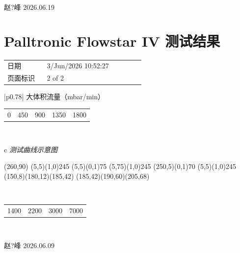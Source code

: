 \documentclass[UTF8,10pt,a4paper,fontset=fandol]{ctexart}
\newcommand{\fieldvalue}[1]{#1}
\newcommand{\handwritten}[1]{#1}
\begin{document}
\vspace{1em}

\handwritten{赵?峰 2026.06.19}

\section*{Palltronic Flowstar IV 测试结果}

\begin{tabular}{@{}p{0.25\linewidth}p{0.62\linewidth}@{}}
日期 &
\fieldvalue{3/Jun/2026 10:52:27}
\\
页面标识 &
\fieldvalue{2 of 2}
\end{tabular}

\vspace{1em}

\begin{center}
\begin{tabular}{|p{0.78\linewidth}|}
\hline
\centering
大体积流量（mbar/min）\\[2pt]
\begin{tabular}{c|c|c|c|c}
0 & 450 & 900 & 1350 & 1800
\end{tabular}\\[4pt]
\centering
\begin{tabular}{c}
\textit{测试曲线示意图}\\[2pt]
\begin{picture}(260,90)
\put(5,5){\line(1,0){245}}
\put(5,5){\line(0,1){75}}
\put(5,75){\line(1,0){245}}
\put(250,5){\line(0,1){70}}
\put(5,5){\line(1,0){245}}
\qbezier(150,8)(180,12)(185,42)
\qbezier(185,42)(190,60)(205,68)
\end{picture}\\[-2pt]
\begin{tabular}{c|c|c|c}
1400 & 2200 & 3000 & 7000
\end{tabular}
\end{tabular}
\\
\hline
\end{tabular}
\end{center}

\handwritten{赵?峰 2026.06.09}
\end{document}
